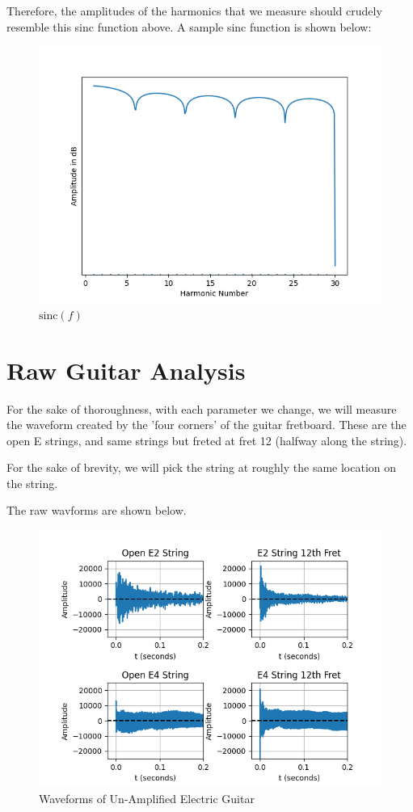 \documentclass[10pt, a4paper]{article}
\begin{document}
Therefore, the amplitudes of the harmonics that we measure should crudely resemble this sinc function above.
A sample sinc function is shown below:
\begin{figure}[H]
\centering
\caption{$\text{sinc} (f)$}
\includegraphics[scale=0.5]{theory.png}
\end{figure}

\section{Raw Guitar Analysis}

For the sake of thoroughness, with each parameter we change, we will measure the waveform created by the 'four corners' of the guitar fretboard. These are the open E strings, and same strings but freted at fret 12 (halfway along the string).

For the sake of brevity, we will pick the string at roughly the same location on the string.

The raw wavforms are shown below.
\begin{figure}[H]
\centering
\caption{Waveforms of Un-Amplified Electric Guitar}
\includegraphics[scale=0.8]{raw_signal.png}
\end{figure}
\end{document}
